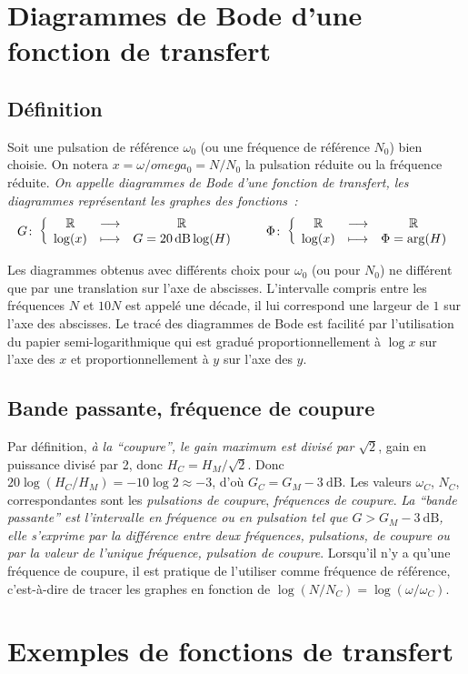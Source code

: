 \section{Diagrammes de Bode d'une fonction de transfert}
\subsection{Définition}
Soit une pulsation de référence $\omega_0$ (ou une fréquence de référence $N_0$) bien choisie. On notera $x = \omega/omega_0 = N/N_0$ la pulsation réduite ou la fréquence réduite. \emph{On appelle diagrammes de Bode d'une fonction de transfert, les diagrammes représentant les graphes des fonctions~:}
\begin{equation}
\fonction{G}{\R}{\R}{\log(x)}{G = \SI{20}{\dB} \log(H)} \qquad \fonction{\Phi}{\R}{\R}{\log(x)}{\Phi = \arg(H)}
\end{equation}

Les diagrammes obtenus avec différents choix pour $\omega_0$ (ou pour $N_0$) ne différent que par une translation sur l'axe de abscisses. L'intervalle compris entre les fréquences $N$ et $10N$ est appelé une décade, il lui correspond une largeur de $1$ sur l'axe des abscisses. Le tracé des diagrammes de Bode est facilité par l'utilisation du papier semi-logarithmique qui est gradué proportionnellement à $\log x$ sur l'axe des $x$ et proportionnellement à $y$ sur l'axe des $y$.

\subsection{Bande passante, fréquence de coupure}
Par définition, \emph{à la ``coupure'', le gain maximum est divisé par $\sqrt{2}$}, gain en puissance divisé par 2, donc $H_C = H_M/\sqrt{2}$. Donc $20\log(H_C/H_M) = -10\log 2 \approx -3$, d'où $G_C = G_M -\SI{3}{\dB}$. Les valeurs $\omega_C$, $N_C$, correspondantes sont les \emph{pulsations de coupure}, \emph{fréquences de coupure}. \emph{La ``bande passante'' est l'intervalle en fréquence ou en pulsation tel que $G > G_M - \SI{3}{\dB}$, elle s'exprime par la différence entre deux fréquences, pulsations, de coupure ou par la valeur de l'unique fréquence, pulsation de coupure}. Lorsqu'il n'y a qu'une fréquence de coupure, il est pratique de l'utiliser comme fréquence de référence, c'est-à-dire de tracer les graphes en fonction de $\log(N/N_C) = \log(\omega/\omega_C)$.

\section{Exemples de fonctions de transfert}
